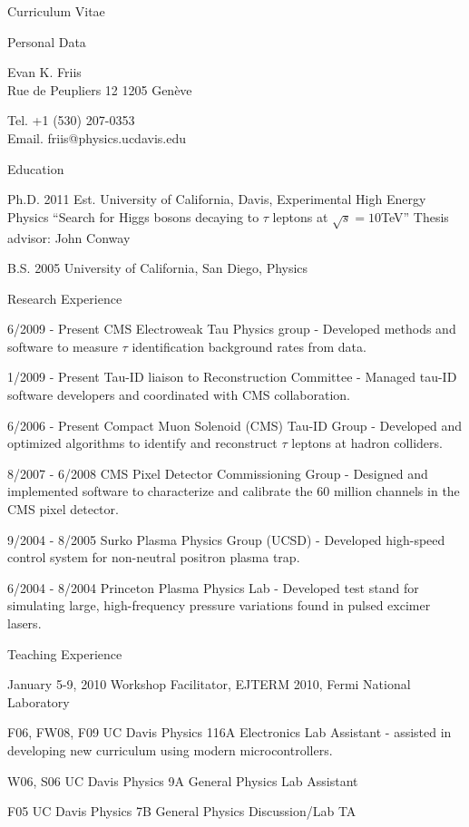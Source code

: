 \documentclass[12pt]{amsart}
\title{}
\author{}
\date{} %
\begin{document}
\nobibliography*
\begin{cv}{Curriculum Vitae}

\begin{cvlist}{Personal Data}
\item Evan K. Friis\\
Rue de Peupliers 12
1205 Gen\`{e}ve\\

\item Tel. +1 (530) 207-0353\\
Email. friis@physics.ucdavis.edu
\end{cvlist}

\begin{cvlist}{Education}
\item[Ph.D. 2011 Est.] University of California, Davis, Experimental High Energy Physics 
   ``Search for Higgs bosons decaying to $\tau$ leptons at $\sqrt s = 10$TeV'' Thesis advisor: John Conway
\item[B.S. 2005] University of California, San Diego, Physics
\end{cvlist}

\begin{cvlist}{Research Experience}
\item[6/2009 - Present] CMS Electroweak Tau Physics group - Developed methods and software to measure $\tau$ identification background rates from data.
\item[1/2009 - Present] Tau-ID liaison to Reconstruction Committee - Managed tau-ID software developers and coordinated with CMS collaboration.
\item[6/2006 - Present] Compact Muon Solenoid (CMS) Tau-ID Group - Developed and optimized algorithms to identify and reconstruct $\tau$ leptons at hadron colliders.
\item[8/2007 - 6/2008] CMS Pixel Detector Commissioning Group - Designed and implemented software to characterize and calibrate the 60 million channels in the CMS pixel detector.
\item[9/2004 - 8/2005] Surko Plasma Physics Group (UCSD) - Developed high-speed control system for non-neutral positron plasma trap.
\item[6/2004 - 8/2004] Princeton Plasma Physics Lab - Developed test stand for simulating large, high-frequency pressure variations found in pulsed excimer lasers.
\end{cvlist}

\begin{cvlist}{Teaching Experience}
\item[January 5-9, 2010] Workshop Facilitator, EJTERM 2010, Fermi National Laboratory
\item[F06, FW08, F09] UC Davis Physics 116A Electronics Lab Assistant -
   assisted in developing new curriculum using modern microcontrollers.
\item[W06, S06] UC Davis Physics 9A General Physics Lab Assistant
\item[F05] UC Davis Physics 7B General Physics Discussion/Lab TA
\end{cvlist}


\end{cv}
\end{document}
